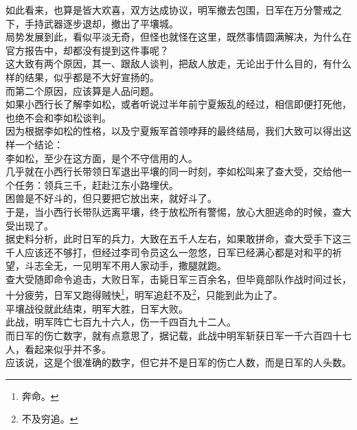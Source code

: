 \begin{multicols}{\theparacolNo}
如此看来，也算是皆大欢喜，双方达成协议，明军撤去包围，日军在万分警戒之下，手持武器逐步退却，撤出了平壤城。\\

局势发展到此，看似平淡无奇，但怪也就怪在这里，既然事情圆满解决，为什么在官方报告中，却都没有提到这件事呢？\\

这大致有两个原因，其一、跟敌人谈判，把敌人放走，无论出于什么目的，有什么样的结果，似乎都是不大好宣扬的。\\

而第二个原因，应该算是人品问题。\\

如果小西行长了解李如松，或者听说过半年前宁夏叛乱的经过，相信即便打死他，也绝不会和李如松谈判。\\

因为根据李如松的性格，以及宁夏叛军首领哱拜的最终结局，我们大致可以得出这样一个结论：\\

李如松，至少在这方面，是个不守信用的人。\\

几乎就在小西行长带领日军退出平壤的同一时刻，李如松叫来了查大受，交给他一个任务：领兵三千，赶赴江东小路埋伏。\\

困兽是不好斗的，但只要把它放出来，就好斗了。\\

于是，当小西行长带队远离平壤，终于放松所有警惕，放心大胆逃命的时候，查大受出现了。\\

据史料分析，此时日军的兵力，大致在五千人左右，如果敢拼命，查大受手下这三千人应该还不够打，但经过李司令员这么一忽悠，日军已经满心都是对和平的祈望，斗志全无，一见明军不用人家动手，撒腿就跑。\\

查大受随即命令追击，大败日军，击毙日军三百余名，但毕竟部队作战时间过长，十分疲劳，日军又跑得贼快\footnote{奔命。}，明军追赶不及\footnote{不及穷追。}，只能到此为止了。\\

平壤战役就此结束，明军大胜，日军大败。\\

此战，明军阵亡七百九十六人，伤一千四百九十二人。\\

而日军的伤亡数字，就有点意思了，据记载，此战中明军斩获日军一千六百四十七人，看起来似乎并不多。\\

应该说，这是个很准确的数字，但它并不是日军的伤亡人数，而是日军的人头数。\\


\end{multicols}
